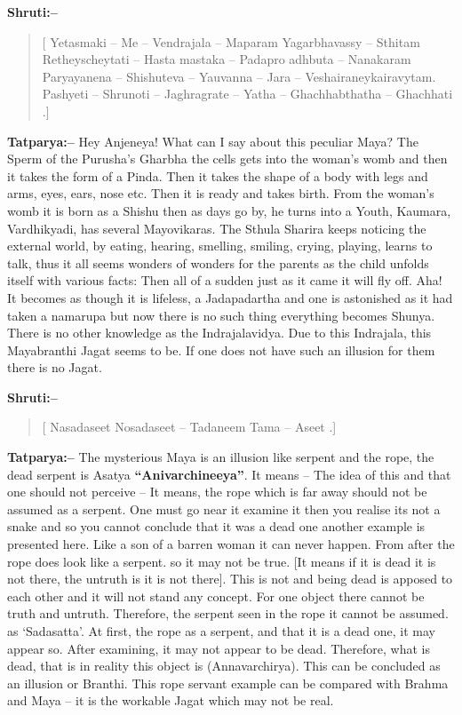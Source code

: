 \textbf{Shruti:–}

\begin{verse}
[ Yetasmaki – Me – Vendrajala – Maparam Yagarbhavassy – Sthitam  Retheyscheytati – Hasta mastaka – Padapro adhbuta – Nanakaram  Paryayanena – Shishuteva – Yauvanna – Jara – Veshairaneykairavytam. Pashyeti – Shrunoti – Jaghragrate – Yatha – Ghachhabthatha – Ghachhati .]
\end{verse}

\textbf{Tatparya:–} Hey Anjeneya! What can I say about this peculiar Maya? The Sperm of the Purusha's Gharbha the cells gets into the woman's womb and then it takes the form of a Pinda. Then it takes the shape of a body with legs and arms, eyes, ears, nose etc. Then it is ready and takes birth. From the woman's womb it is born as a Shishu then as days go by, he turns into a Youth, Kaumara, Vardhikyadi, has several Mayovikaras. The Sthula Sharira keeps noticing the external world, by eating, hearing, smelling, smiling, crying, playing, learns to talk, thus it all seems wonders of wonders for the parents as the child unfolds itself with various facts: Then all of a sudden just as it came it will fly off. Aha! It becomes as though it is lifeless, a Jadapadartha and one is astonished as it had taken a namarupa but now there is no such thing everything becomes Shunya. There is no other knowledge as the Indrajalavidya. Due to this Indrajala, this Mayabranthi Jagat seems to be. If one does not have such an illusion for them there is no Jagat.

\textbf{Shruti:–}

\begin{verse}
[ Nasadaseet Nosadaseet – Tadaneem Tama – Aseet .]
\end{verse}

\textbf{Tatparya:–} The mysterious Maya is an illusion like serpent and the rope, the dead serpent is Asatya \textbf{“Anivarchineeya”}. It means – The idea of this and that one should not perceive – It means, the rope which is far away should not be assumed as a serpent. One must go near it examine it then you realise its not a snake and so you cannot conclude that it was a dead one another example is presented here. Like a son of a barren woman it can never happen. From after the rope does look like a serpent. so it may not be true. [It means if it is dead it is not there, the untruth is it is not there]. This is not and being dead is apposed to each other and it will not stand any concept. For one object there cannot be truth and untruth. Therefore, the serpent seen in the rope it cannot be assumed. as ‘Sadasatta’. At first, the rope as a serpent, and that it is a dead one, it may appear so. After examining, it may not appear to be dead. Therefore, what is dead, that is in reality this object is (Annavarchirya). This can be concluded as an illusion or Branthi. This rope servant example can be compared with Brahma and Maya – it is the workable Jagat which may not be real.

